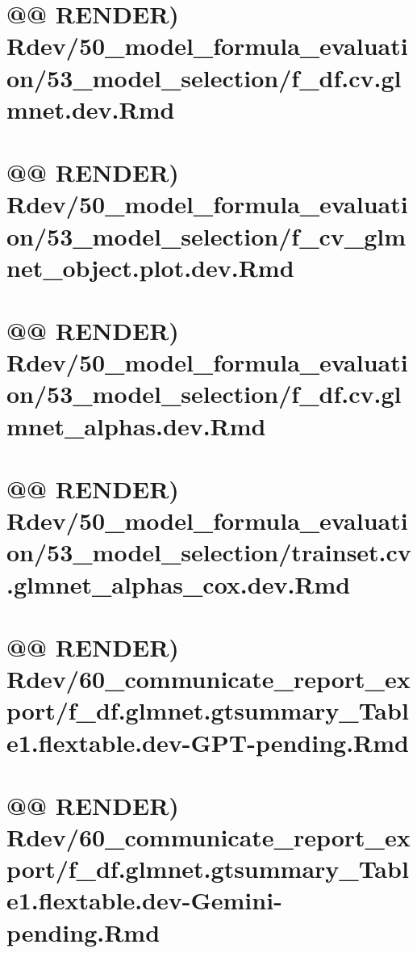\documentclass[
]{article}
\begin{document}
\hypertarget{render-rdev50_model_formula_evaluation53_model_selectionf_df.cv.glmnet.dev.rmd}{%
\section{@@ RENDER)
Rdev/50\_model\_formula\_evaluation/53\_model\_selection/f\_df.cv.glmnet.dev.Rmd}\label{render-rdev50_model_formula_evaluation53_model_selectionf_df.cv.glmnet.dev.rmd}}

\hypertarget{render-rdev50_model_formula_evaluation53_model_selectionf_cv_glmnet_object.plot.dev.rmd}{%
\section{@@ RENDER)
Rdev/50\_model\_formula\_evaluation/53\_model\_selection/f\_cv\_glmnet\_object.plot.dev.Rmd}\label{render-rdev50_model_formula_evaluation53_model_selectionf_cv_glmnet_object.plot.dev.rmd}}

\hypertarget{render-rdev50_model_formula_evaluation53_model_selectionf_df.cv.glmnet_alphas.dev.rmd}{%
\section{@@ RENDER)
Rdev/50\_model\_formula\_evaluation/53\_model\_selection/f\_df.cv.glmnet\_alphas.dev.Rmd}\label{render-rdev50_model_formula_evaluation53_model_selectionf_df.cv.glmnet_alphas.dev.rmd}}

\hypertarget{render-rdev50_model_formula_evaluation53_model_selectiontrainset.cv.glmnet_alphas_cox.dev.rmd}{%
\section{@@ RENDER)
Rdev/50\_model\_formula\_evaluation/53\_model\_selection/trainset.cv.glmnet\_alphas\_cox.dev.Rmd}\label{render-rdev50_model_formula_evaluation53_model_selectiontrainset.cv.glmnet_alphas_cox.dev.rmd}}

\hypertarget{render-rdev60_communicate_report_exportf_df.glmnet.gtsummary_table1.flextable.dev-gpt-pending.rmd}{%
\section{@@ RENDER)
Rdev/60\_communicate\_report\_export/f\_df.glmnet.gtsummary\_Table1.flextable.dev-GPT-pending.Rmd}\label{render-rdev60_communicate_report_exportf_df.glmnet.gtsummary_table1.flextable.dev-gpt-pending.rmd}}

\hypertarget{render-rdev60_communicate_report_exportf_df.glmnet.gtsummary_table1.flextable.dev-gemini-pending.rmd}{%
\section{@@ RENDER)
Rdev/60\_communicate\_report\_export/f\_df.glmnet.gtsummary\_Table1.flextable.dev-Gemini-pending.Rmd}\label{render-rdev60_communicate_report_exportf_df.glmnet.gtsummary_table1.flextable.dev-gemini-pending.rmd}}
\end{document}
